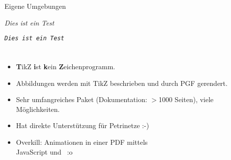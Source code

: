 \documentclass{beamer}
\begin{document}
		
		\begin{frame}[containsverbatim]{Eigene Umgebungen}
			\begin{latexcode}
\newenvironment{textttit}
               {\begingroup\ttfamily\itshape}
               {\endgroup}
\begin{textttit}
	Dies ist ein Test
\end{textttit}
			\end{latexcode}
			\texttt{\textit{Dies ist ein Test}}
		\end{frame}
		
		
%		


		\section{\protect\TikZ}
		
		\begin{frame}[containsverbatim]{\TikZ}
			\begin{itemize}
				\item \textbf{T}ikZ \textbf{i}st \textbf{k}ein \textbf{Z}eichenprogramm.
				\item Abbildungen werden mit TikZ beschrieben und durch PGF gerendert.
				\item Sehr umfangreiches Paket (Dokumentation: $>$1000 Seiten), viele Möglichkeiten.
				\item Hat direkte Unterstützung für Petrinetze :-)
				\item Overkill: Animationen in einer PDF mittels\\
				JavaScript und \TikZ ~:o
			\end{itemize}
			
			
			\vspace{-1.25cm}
			\hspace{8.5cm}
		\end{frame}
\end{document}
